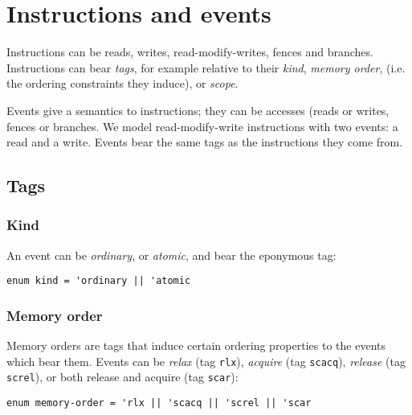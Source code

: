 \section{Instructions and events}

Instructions can be reads, writes, read-modify-writes, fences and branches.
Instructions can bear \emph{tags}, for example relative to their \emph{kind},
\emph{memory order}, (i.e. the ordering constraints they induce), or
\emph{scope}.

Events give a semantics to instructions; they can be accesses (reads or writes,
fences or branches. We model read-modify-write instructions with two events: a
read and a write. Events bear the same tags as the instructions they come
from.

\subsection{Tags}

\subsubsection{Kind}

An event can be \emph{ordinary}, or \emph{atomic}, and bear the eponymous tag:
\begin{verbatim}
enum kind = 'ordinary || 'atomic
\end{verbatim}

%
%

\subsubsection{Memory order}

Memory orders are tags that induce certain ordering properties to the
events which bear them. Events can be \emph{relax} (tag {\tt rlx}),
\emph{acquire} (tag {\tt scacq}), \emph{release} (tag {\tt screl}), or both
release and acquire (tag {\tt scar}):
\begin{verbatim}
enum memory-order = 'rlx || 'scacq || 'screl || 'scar
\end{verbatim}

